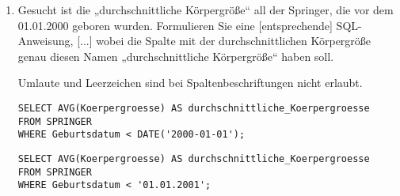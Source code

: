 \documentclass{lehramt-informatik-aufgabe}
\begin{document}
\begin{enumerate}
\item Gesucht ist die „durchschnittliche Körpergröße“ all der Springer,
die vor dem 01.01.2000 geboren wurden. Formulieren Sie eine
[entsprechende] SQL-Anweisung, [...] wobei die Spalte mit der
durchschnittlichen Körpergröße genau diesen Namen „durchschnittliche
Körpergröße“ haben soll.

\begin{antwort}
Umlaute und Leerzeichen sind bei Spaltenbeschriftungen nicht erlaubt.

\begin{verbatim}
SELECT AVG(Koerpergroesse) AS durchschnittliche_Koerpergroesse
FROM SPRINGER
WHERE Geburtsdatum < DATE('2000-01-01');
\end{verbatim}
\end{antwort}

\begin{antwort}[muster]
\begin{verbatim}
SELECT AVG(Koerpergroesse) AS durchschnittliche_Koerpergroesse
FROM SPRINGER
WHERE Geburtsdatum < '01.01.2001';
\end{verbatim}
\end{antwort}

\end{enumerate}
\end{document}

